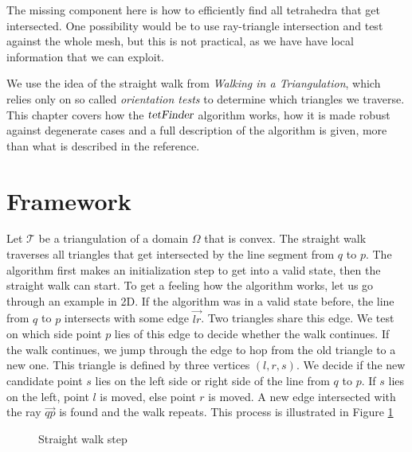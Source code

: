 \documentclass[../thesis.tex]{subfiles}
\begin{document}
The missing component here is how to efficiently find all tetrahedra
that get intersected. One possibility would be to use ray-triangle intersection and
test against the whole mesh, but this is not practical, as we have have local information
that we can exploit.

We use the idea of the straight walk from \emph{Walking in a Triangulation}\cite{Devillers}, which relies only on
so called \emph{orientation tests} to determine which triangles we traverse.
This chapter covers how the $\textsl{tetFinder}$ algorithm works, how it is made robust
against degenerate cases
and a full description of the algorithm is given, more than what is described in the reference.
\section{Framework}
\label{sec:framework}

Let $\mathcal{T}$ be a triangulation of a domain $\Omega$ that is convex.
The straight walk traverses all triangles that get intersected by the line segment
from $q$ to $p$. The algorithm first makes an initialization step to get into a valid state, 
then the straight walk can start.
To get a feeling how the algorithm works, let us go through an example in 2D.
If the algorithm was in a valid state before, the line from $q$ to $p$
intersects with some edge $\vec{lr}$. Two triangles share this edge.
We test on which side point $p$ lies of this edge to decide whether the walk continues.
If the walk continues, we jump through the edge to hop from the old triangle to a new one.
This triangle is defined by three vertices $(l,r,s)$. We decide if
the new candidate point $s$ lies on the left side or right side of the line from $q$ to $p$.
If $s$ lies on the left, point $l$ is moved, else point $r$ is moved.
A new edge intersected with the ray $\vec{qp}$ is found and the walk repeats.
This process is illustrated in Figure \ref{fig:straight-walk-2d}
\begin{figure}[htb]
  \centering
  \def\svgwidth{35em}
  
  \caption{Straight walk step}\label{fig:straight-walk-2d}        
\end{figure}
\end{document}
